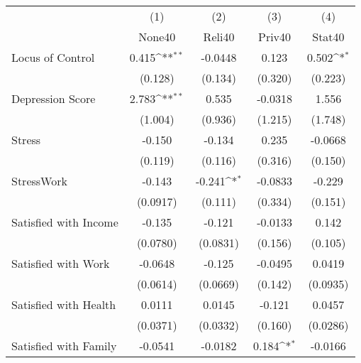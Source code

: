 {
\def\sym#1{\ifmmode^{#1}\else\(^{#1}\)\fi}
\begin{tabular}{l*{4}{c}}
\hline\hline
            &\multicolumn{1}{c}{(1)}&\multicolumn{1}{c}{(2)}&\multicolumn{1}{c}{(3)}&\multicolumn{1}{c}{(4)}\\
            &\multicolumn{1}{c}{None40}&\multicolumn{1}{c}{Reli40}&\multicolumn{1}{c}{Priv40}&\multicolumn{1}{c}{Stat40}\\
\hline
Locus of Control&       0.415\sym{**} &     -0.0448         &       0.123         &       0.502\sym{*}  \\
            &     (0.128)         &     (0.134)         &     (0.320)         &     (0.223)         \\
[1em]
Depression Score&       2.783\sym{**} &       0.535         &     -0.0318         &       1.556         \\
            &     (1.004)         &     (0.936)         &     (1.215)         &     (1.748)         \\
[1em]
Stress      &      -0.150         &      -0.134         &       0.235         &     -0.0668         \\
            &     (0.119)         &     (0.116)         &     (0.316)         &     (0.150)         \\
[1em]
StressWork  &      -0.143         &      -0.241\sym{*}  &     -0.0833         &      -0.229         \\
            &    (0.0917)         &     (0.111)         &     (0.334)         &     (0.151)         \\
[1em]
Satisfied with Income&      -0.135         &      -0.121         &     -0.0133         &       0.142         \\
            &    (0.0780)         &    (0.0831)         &     (0.156)         &     (0.105)         \\
[1em]
Satisfied with Work&     -0.0648         &      -0.125         &     -0.0495         &      0.0419         \\
            &    (0.0614)         &    (0.0669)         &     (0.142)         &    (0.0935)         \\
[1em]
Satisfied with Health&      0.0111         &      0.0145         &      -0.121         &      0.0457         \\
            &    (0.0371)         &    (0.0332)         &     (0.160)         &    (0.0286)         \\
[1em]
Satisfied with Family&     -0.0541         &     -0.0182         &       0.184\sym{*}  &     -0.0166         \\

\end{tabular}}
